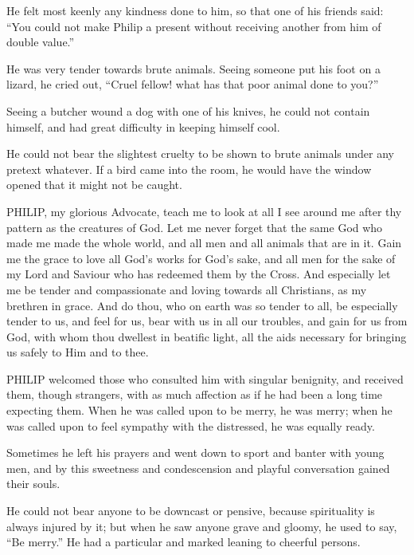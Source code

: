 He felt most keenly any kindness
done to him, so that one of his friends said: ``You could not make Philip
a present without receiving another from him of double value.''

He was very tender towards brute
animals. Seeing someone put his foot on a lizard, he cried out, ``Cruel
fellow! what has that poor animal done to you?''

Seeing a butcher wound a dog
with one of his knives, he could not contain himself, and had great
difficulty in keeping himself cool.

He could not bear the slightest
cruelty to be shown to brute animals under any pretext whatever. If a
bird came into the room, he would have the window opened that it might
not be caught.


PHILIP, my glorious
Advocate, teach me to look at all I see around me after thy pattern as
the creatures of God. Let me never forget that the same God who made me
made the whole world, and all men and all animals that are in it. Gain
me the grace to love all God's works for God's sake, and all men for the
sake of my Lord and Saviour who has redeemed them by the Cross. And
especially let me be tender and compassionate and loving towards all
Christians, as my brethren in grace. And do thou, who on earth was so
tender to all, be especially tender to us, and feel for us, bear with us
in all our troubles, and gain for us from God, with whom thou dwellest
in beatific light, all the aids necessary for bringing us safely to Him
and to thee.



PHILIP welcomed those
who consulted him with singular benignity, and received them, though
strangers, with as much affection as if he had been a long time
expecting them. When he was called upon to be merry, he was merry; when
he was called upon to feel sympathy with the distressed, he was equally
ready.

Sometimes he left his prayers
and went down to sport and banter with young men, and by this sweetness
and condescension and playful conversation gained their souls.

He could not bear anyone to be
downcast or pensive, because spirituality is always injured by it; but
when he saw anyone grave and gloomy, he used to say, ``Be merry.'' He had
a particular and marked leaning to cheerful persons.

